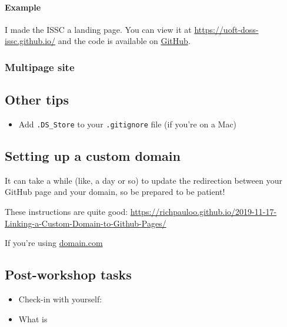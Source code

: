 \documentclass[
]{article}
\providecommand{\tightlist}{%
  \setlength{\itemsep}{0pt}\setlength{\parskip}{0pt}}
\begin{document}
\hypertarget{example}{%
\paragraph{Example}\label{example}}

I made the ISSC a landing page. You can view it at \url{https://uoft-doss-issc.github.io/} and the code is available on \href{https://github.com/UofT-DoSS-ISSC/UofT-DoSS-ISSC.github.io}{GitHub}.

\hypertarget{multipage-site}{%
\subsubsection{Multipage site}\label{multipage-site}}

\hypertarget{other-tips}{%
\subsection{Other tips}\label{other-tips}}

\begin{itemize}
\tightlist
\item
  Add \texttt{.DS\_Store} to your \texttt{.gitignore} file (if you're on a Mac)
\end{itemize}

\hypertarget{setting-up-a-custom-domain}{%
\subsection{Setting up a custom domain}\label{setting-up-a-custom-domain}}

It can take a while (like, a day or so) to update the redirection between your GitHub page and your domain, so be prepared to be patient!

These instructions are quite good:
\url{https://richpauloo.github.io/2019-11-17-Linking-a-Custom-Domain-to-Github-Pages/}

If you're using \href{https://domain.com}{domain.com}

\hypertarget{post-workshop-tasks}{%
\subsection{Post-workshop tasks}\label{post-workshop-tasks}}

\begin{itemize}
\tightlist
\item
  Check-in with yourself:
\item
  What is
\end{itemize}
\end{document}
